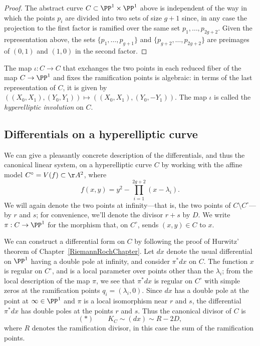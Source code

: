 \begin{proof}
The abstract curve $C\subset \PP^{1}\times \PP^{1}$ above
is independent of the way in which the points $p_{i}$ are divided
into two sets of size $g+1$ since, in any case the projection to the first factor 
is ramified over the same set $p_{1}, \dots, p_{2g+2}$. Given the representation above, the sets
$\{p_1, \dots,  p_{g+1}\}$ and  $\{p_{g+2}, \dots,  p_{2g+2}\}$ are preimages of $(0,1)$ and
$(1,0)$ in the second factor.
\end{proof}

 The map $\iota : C \to C$ that exchanges the two points in each reduced fiber of the map $C \to \PP^1$ and fixes the ramification points is algebraic: in terms of the last representation of $C$, it is given by $((X_0,X_1), (Y_0,Y_1)) \mapsto  ((X_0,X_1), (Y_0,-Y_1)) $. The map $\iota$ is called the \emph{hyperelliptic involution} on $C$.

  \subsection{Differentials on a hyperelliptic curve}\label{hyperelliptic differentials}

We can give a pleasantly concrete description of the differentials, and thus the canonical linear system, on a hyperelliptic curve $C$ by working with the affine model $C^\circ = V(f) \subset \AA^2$, where
$$
f(x,y) = y^2 - \prod_{i=1}^{2g+2} (x - \lambda_i).
$$
We will again denote the two points at infinity---that is, the two points of $C \setminus C^\circ$---by $r$ and $s$; for convenience, we'll denote the divisor $r+s$ by $D$. We write $\pi:C \to \PP^1$ for the morphism that, on $C^\circ$, sends $(x,y) \in C$ to $x$.

We can construct a differential form on $C$ by following the proof of Hurwitz' theorem of Chapter~\ref{RiemannRochChapter}.
Let $dx$ denote the usual differential on $\PP^1$ having a double pole at infinity, and consider $\pi^*dx$ on $C$.  The function $x$ is regular on $C^\circ$, and is a local parameter over points other than the $\lambda_i$; from the local description of the map $\pi$, we see that $\pi^*dx$ is regular on $C^\circ$  with simple zeros at the ramification points $q_i = (\lambda_i, 0)$. Since $dx$ has a double pole at the point at $\infty\in \PP^1$ and $\pi$ is a local isomorphism near $r$ and $s$, the differential $\pi^*dx$ has double poles at the points $r$ and $s$. Thus the canonical
divisor of $C$ is 
$$
(*) \qquad K_C \sim (dx) \sim R - 2D,
$$
where $R$ denotes the ramification divisor, in this case the sum of the ramification points. 

